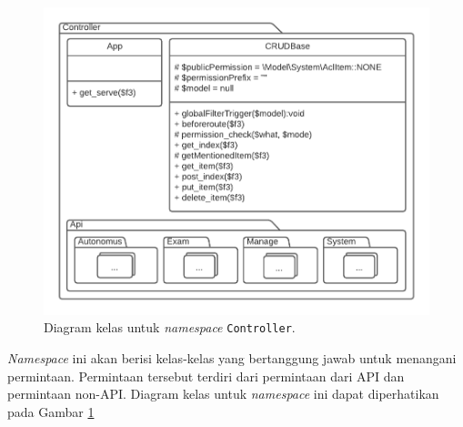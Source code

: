     \begin{figure}
        \centering
        \includegraphics{Gambar/classmap-be/Classmap - app-controller.pdf}
        \caption{Diagram kelas untuk \textit{namespace} \texttt{Controller}.}
        \label{fig:classmap_app-controller}
    \end{figure}

    \textit{Namespace} ini akan berisi kelas-kelas yang bertanggung jawab untuk
    menangani permintaan. Permintaan tersebut terdiri dari permintaan dari API
    dan permintaan non-API. Diagram kelas untuk \textit{namespace} ini dapat
    diperhatikan pada Gambar
    \ref{fig:classmap_app-controller}
    
